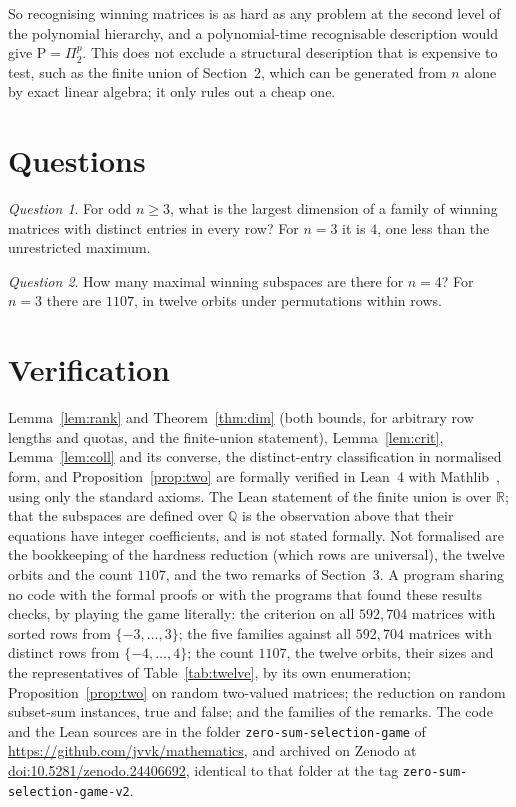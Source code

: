 \documentclass[11pt]{article}
\theoremstyle{definition}
\theoremstyle{remark}
\newtheorem*{question}{Question}
\newcommand{\R}{\mathbb{R}}
\newcommand{\Q}{\mathbb{Q}}
\begin{document}
So recognising winning matrices is as hard as any problem at the second level of the polynomial hierarchy, and a polynomial-time recognisable description would give $\mathrm{P}=\Pi_2^p$. This does not exclude a structural description that is expensive to test, such as the finite union of Section~2, which can be generated from $n$ alone by exact linear algebra; it only rules out a cheap one.

\section{Questions}

\begin{question}
For odd $n\ge3$, what is the largest dimension of a family of winning matrices with distinct entries in every row? For $n=3$ it is $4$, one less than the unrestricted maximum.
\end{question}

\begin{question}
How many maximal winning subspaces are there for $n=4$? For $n=3$ there are $1107$, in twelve orbits under permutations within rows.
\end{question}

\section{Verification}\label{sec:verify}

Lemma~\ref{lem:rank} and Theorem~\ref{thm:dim} (both bounds, for arbitrary row lengths and quotas, and the finite-union statement), Lemma~\ref{lem:crit}, Lemma~\ref{lem:coll} and its converse, the distinct-entry classification in normalised form, and Proposition~\ref{prop:two} are formally verified in Lean~4 with Mathlib~\cite{mathlib}, using only the standard axioms. The Lean statement of the finite union is over $\R$; that the subspaces are defined over $\Q$ is the observation above that their equations have integer coefficients, and is not stated formally. Not formalised are the bookkeeping of the hardness reduction (which rows are universal), the twelve orbits and the count $1107$, and the two remarks of Section~3. A program sharing no code with the formal proofs or with the programs that found these results checks, by playing the game literally: the criterion on all $592{,}704$ matrices with sorted rows from $\{-3,\dots,3\}$; the five families against all $592{,}704$ matrices with distinct rows from $\{-4,\dots,4\}$; the count $1107$, the twelve orbits, their sizes and the representatives of Table~\ref{tab:twelve}, by its own enumeration; Proposition~\ref{prop:two} on random two-valued matrices; the reduction on random subset-sum instances, true and false; and the families of the remarks. The code and the Lean sources are in the folder \texttt{zero-sum-selection-game} of
\url{https://github.com/jvvk/mathematics}, and archived on Zenodo at
\href{https://doi.org/10.5281/zenodo.24406692}{doi:10.5281/zenodo.24406692}, identical to that folder at the tag
\texttt{zero-sum-selection-game-v2}.
\end{document}
